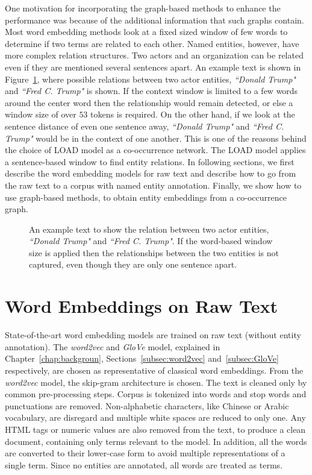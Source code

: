 One motivation for incorporating the graph-based methods to enhance the performance was because of the additional information that such graphs contain. Most word embedding methods look at a fixed sized window of few words to determine if two terms are related to each other. Named entities, however, have more complex relation structures. Two  actors and an organization can be related even if they are mentioned several sentences apart. An example text is shown in Figure~\ref{fig:article_entities}, where possible relations between  two actor entities, \emph{``Donald Trump"} and \emph{``Fred C. Trump"} is shown. If the context window is limited to a few words around the center word then the relationship would remain detected, or else a window size of over $53$ tokens is required. On the other hand, if we look at the sentence distance of even one sentence away,  \emph{``Donald Trump"} and \emph{``Fred C. Trump"} would be in the context of one another. This is one of the reasons behind the choice of LOAD model as a co-occurrence network. The LOAD model applies a sentence-based window to find entity relations. In following sections, we first describe the word embedding models for raw text and describe how to go from the raw text to a corpus with named entity annotation. Finally, we show how to use graph-based methods, to obtain entity embeddings from a co-occurrence graph. 

\begin{figure}
\centering 
\resizebox{0.90\textwidth}{0.2\textwidth}{      

}
\caption{An example text to show the relation between two actor entities, \emph{``Donald Trump"} and \emph{``Fred C. Trump"}. If the word-based window size is applied then the relationships between the two entities is not captured, even though they are only one sentence apart. }
\label{fig:article_entities}
\end{figure}
\section{Word Embeddings on Raw Text}\label{sec:raw}
State-of-the-art word embedding models are trained on raw text (without entity annotation). The \emph{word2vec} and \emph{GloVe} model, explained in Chapter~\ref{chap:backgroun}, Sections~\ref{subsec:word2vec} and~\ref{subsec:GloVe} respectively, are chosen as representative of classical word embeddings. From the \emph{word2vec} model, the skip-gram architecture is chosen. The text is cleaned only by common pre-processing steps. Corpus is tokenized into words and stop words and punctuations are removed. Non-alphabetic characters, like Chinese or Arabic vocabulary, are disregard and multiple white spaces are reduced to only one.  Any HTML tags or numeric values are also removed from the text, to produce a clean document, containing only terms relevant to the model. In addition, all the words are converted to their lower-case form to avoid multiple representations of a single term. Since no entities are annotated, all words are treated as terms. 
